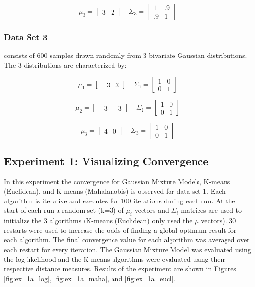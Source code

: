 \documentclass[conference]{IEEEtran}
\begin{document}
$$
\mu_3 = 
\begin{bmatrix} 
3 & 2  
\end{bmatrix}
\quad
\Sigma_3 = 
\begin{bmatrix} 
1 & .9  \\
.9 & 1
\end{bmatrix}
$$

\subsubsection{Data Set 3}
consists of 600 samples drawn randomly from 3 bivariate Gaussian distributions.  The 3 distributions are characterized by:

$$
\mu_1 = 
\begin{bmatrix} 
-3 & 3  
\end{bmatrix}
\quad
\Sigma_1 = 
\begin{bmatrix} 
1 & 0  \\
0 & 1
\end{bmatrix}
$$

$$
\mu_2 = 
\begin{bmatrix} 
-3 & -3  
\end{bmatrix}
\quad
\Sigma_2 = 
\begin{bmatrix} 
1 & 0  \\
0 & 1
\end{bmatrix}
$$

$$
\mu_3 = 
\begin{bmatrix} 
4 & 0  
\end{bmatrix}
\quad
\Sigma_3 = 
\begin{bmatrix} 
1 & 0  \\
0 & 1
\end{bmatrix}
$$



\subsection{Experiment 1: Visualizing Convergence}
In this experiment the convergence for Gaussian Mixture Models, K-means (Euclidean), and K-means (Mahalanobis) is observed for data set 1.  Each algorithm is iterative and executes for 100 iterations during each run.  At the start of each run a random set (k=3) of $\mu_i$ vectors and $\Sigma_i$ matrices are used to initialize the 3 algorithms (K-means (Euclidean) only used the $\mu$ vectors).  30 restarts were used to increase the odds of finding a global optimum result for each algorithm.  The final convergence value for each algorithm was averaged over each restart for every iteration.  The Gaussian Mixture Model was evaluated using the log likelihood and the K-means algorithms were evaluated using their respective distance measures.  Results of the experiment are shown in Figures \ref{fig:ex_1a_log}, \ref{fig:ex_1a_maha}, and \ref{fig:ex_1a_eucl}.
\end{document}
